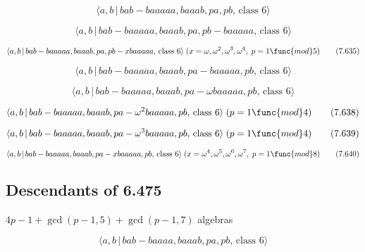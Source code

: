 \documentclass[10pt]{article}
\begin{document}
\begin{equation}
\langle a,b\,|\,bab-baaaaa,baaab,pa,pb,\,\text{class }6\rangle  \tag{7.633}
\end{equation}

\begin{equation}
\langle a,b\,|\,bab-baaaaa,baaab,pa,pb-baaaaa,\,\text{class }6\rangle 
\tag{7.634}
\end{equation}

\begin{equation}
\langle a,b\,|\,bab-baaaaa,baaab,pa,pb-xbaaaaa,\,\text{class }6\rangle
\;(x=\omega ,\omega ^{2},\omega ^{3},\omega ^{4},\;p=1\func{mod}5) 
\tag{7.635}
\end{equation}

\begin{equation}
\langle a,b\,|\,bab-baaaaa,baaab,pa-baaaaa,pb,\,\text{class }6\rangle 
\tag{7.636}
\end{equation}

\begin{equation}
\langle a,b\,|\,bab-baaaaa,baaab,pa-\omega baaaaa,pb,\,\text{class }6\rangle
\tag{7.637}
\end{equation}

\begin{equation}
\langle a,b\,|\,bab-baaaaa,baaab,pa-\omega ^{2}baaaaa,pb,\,\text{class }%
6\rangle \;(p=1\func{mod}4)  \tag{7.638}
\end{equation}

\begin{equation}
\langle a,b\,|\,bab-baaaaa,baaab,pa-\omega ^{3}baaaaa,pb,\,\text{class }%
6\rangle \;(p=1\func{mod}4)  \tag{7.639}
\end{equation}

\begin{equation}
\langle a,b\,|\,bab-baaaaa,baaab,pa-xbaaaaa,pb,\,\text{class }6\rangle
\;(x=\omega ^{4},\omega ^{5},\omega ^{6},\omega ^{7},\;p=1\func{mod}8) 
\tag{7.640}
\end{equation}

\subsection{Descendants of 6.475}

$4p-1+\gcd (p-1,5)+\gcd (p-1,7)$ algebras

\begin{equation}
\langle a,b\,|\,bab-baaaa,baaab,pa,pb,\,\text{class }6\rangle  \tag{7.641}
\end{equation}
\end{document}
